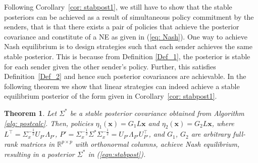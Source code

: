 \documentclass[12pt,journal,onecolumn]{IEEEtran}
\newtheorem{theorem}{Theorem}
\begin{document}
Following Corollary~\ref{cor: stabpost1}, we still have to show that the stable posteriors can be achieved as a result of simultaneous policy commitment by the senders, that is that there exists a pair of policies that achieve the posterior covariance and constitute of a NE %
as given in (\ref{eq: Nash}). One way to achieve Nash equilibrium is to design strategies such that each sender achieves the same stable posterior. This is because from Definition \ref{Def_1}, the posterior is stable for each sender given the other sender's policy. Further, this satisfies Definition~\ref{Def_2} and hence such posterior covariances are achievable. In the following theorem we show that linear strategies can indeed achieve a stable equilibrium posterior of the form given in Corollary~\ref{cor: stabpost1}.
\begin{theorem}\label{th: Nasheq}
Let $\Sigma^*$ be a stable posterior covariance obtained from Algorithm \ref{alg: postcalc}. Then, policies $\eta_1(\boldsymbol{x})=G_1L\boldsymbol{x} $ and $\eta_2(\boldsymbol{x})=G_2L\boldsymbol{x}$, where $L^\top=\Sigma_x^{-\frac{1}{2}}U_{P'}\Lambda_{P'}$, $P'=\Sigma_x^{-\frac{1}{2}}\Sigma^*\Sigma_x^{-\frac{1}{2}}=U_{P'}\Lambda_{P'}U_{P'}^\top$, and $G_1$, $G_2$ are arbitrary full-rank matrices in $\mathbb{R}^{p\times p}$ with orthonormal columns, %
achieve Nash equilibrium, resulting in a posterior $\Sigma^*$ in (\ref{eqn:stabpost}). 
\end{theorem}
\end{document}
